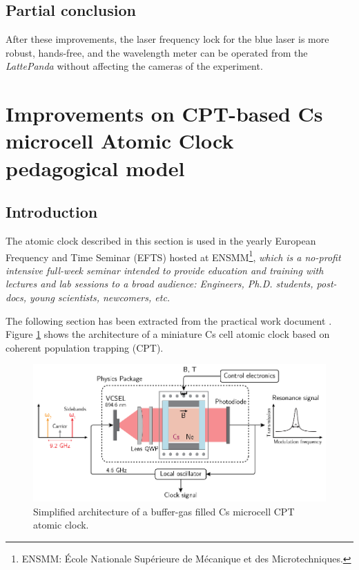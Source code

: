 \documentclass[a4paper,12pt]{article}
\begin{document}
\subsection{Partial conclusion}

After these improvements, the laser frequency lock for the blue laser is more robust, hands-free, and the wavelength meter can be operated from the \textit{LattePanda} without affecting the cameras of the experiment.

\newpage
\section{Improvements on CPT-based Cs microcell Atomic Clock pedagogical model}
\subsection{Introduction}
\label{section:tp_info}
The atomic clock described in this section is used in the yearly European Frequency and Time Seminar (EFTS) hosted at ENSMM\footnote{ENSMM: École Nationale Supérieure de Mécanique et des Microtechniques.}, \textit{which is a no-profit intensive full-week seminar intended to provide education and training with lectures and lab sessions to a broad audience: Engineers, Ph.D. students, post-docs, young scientists, newcomers, etc. }\cite{efts}

The following section has been extracted from the practical work document \cite{tp}. Figure \ref{fig:globalcpt} shows the architecture of a miniature Cs cell atomic clock based on coherent population trapping (CPT).

\begin{figure}[h!]
	\centering
	\includegraphics[width=0.9\linewidth]{Images/globalCPT.png}
	\caption{Simplified architecture of a buffer-gas filled Cs microcell CPT atomic clock.}
	\label{fig:globalcpt}
\end{figure}
\end{document}
